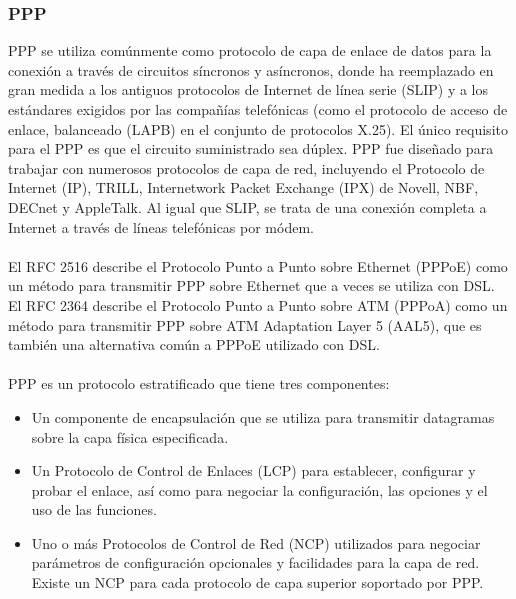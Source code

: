 \documentclass[12pt,letterpaper]{article}
\begin{document}
\subsubsection{PPP}
PPP se utiliza comúnmente como protocolo de capa de enlace de datos para la conexión a través 
de circuitos síncronos y asíncronos, donde ha reemplazado en gran medida a los antiguos 
protocolos de Internet de línea serie (SLIP) y a los estándares exigidos por las compañías 
telefónicas (como el protocolo de acceso de enlace, balanceado (LAPB) en el conjunto de 
protocolos X.25). El único requisito para el PPP es que el circuito suministrado sea dúplex. 
PPP fue diseñado para trabajar con numerosos protocolos de capa de red, incluyendo el 
Protocolo de Internet (IP), TRILL, Internetwork Packet Exchange (IPX) de Novell, NBF, 
DECnet y AppleTalk. Al igual que SLIP, se trata de una conexión completa a Internet a 
través de líneas telefónicas por módem. 
\\ \\
El RFC 2516 describe el Protocolo Punto a Punto sobre Ethernet (PPPoE) como un método para 
transmitir PPP sobre Ethernet que a veces se utiliza con DSL. El RFC 2364 describe el 
Protocolo Punto a Punto sobre ATM (PPPoA) como un método para transmitir PPP sobre ATM 
Adaptation Layer 5 (AAL5), que es también una alternativa común a PPPoE utilizado con DSL.\cite{ppp}
\\ \\
PPP es un protocolo estratificado que tiene tres componentes:
\begin{itemize}
    \item Un componente de encapsulación que se utiliza para transmitir datagramas sobre la capa física especificada.
    \item Un Protocolo de Control de Enlaces (LCP) para establecer, configurar y probar el enlace, así como para negociar la configuración, las opciones y el uso de las funciones.
    \item Uno o más Protocolos de Control de Red (NCP) utilizados para negociar parámetros de configuración opcionales y facilidades para la capa de red. Existe un NCP para cada protocolo de capa superior soportado por PPP.
\end{itemize}
\end{document}
